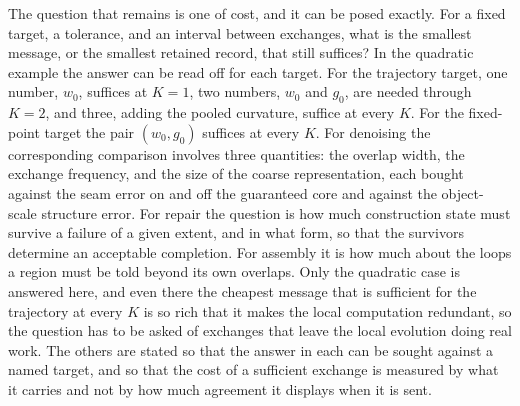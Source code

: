 \documentclass[11pt]{article}
\theoremstyle{definition}
\theoremstyle{plain}
\theoremstyle{remark}
\begin{document}
The question that remains is one of cost, and it can be posed exactly. For a fixed target, a tolerance, and an interval between exchanges, what is the smallest message, or the smallest retained record, that still suffices? In the quadratic example the answer can be read off for each target. For the trajectory target, one number, $w_0$, suffices at $K=1$, two numbers, $w_0$ and $g_0$, are needed through $K=2$, and three, adding the pooled curvature, suffice at every $K$. For the fixed-point target the pair $(w_0,g_0)$ suffices at every $K$. For denoising the corresponding comparison involves three quantities: the overlap width, the exchange frequency, and the size of the coarse representation, each bought against the seam error on and off the guaranteed core and against the object-scale structure error. For repair the question is how much construction state must survive a failure of a given extent, and in what form, so that the survivors determine an acceptable completion. For assembly it is how much about the loops a region must be told beyond its own overlaps. Only the quadratic case is answered here, and even there the cheapest message that is sufficient for the trajectory at every $K$ is so rich that it makes the local computation redundant, so the question has to be asked of exchanges that leave the local evolution doing real work. The others are stated so that the answer in each can be sought against a named target, and so that the cost of a sufficient exchange is measured by what it carries and not by how much agreement it displays when it is sent.
\end{document}
